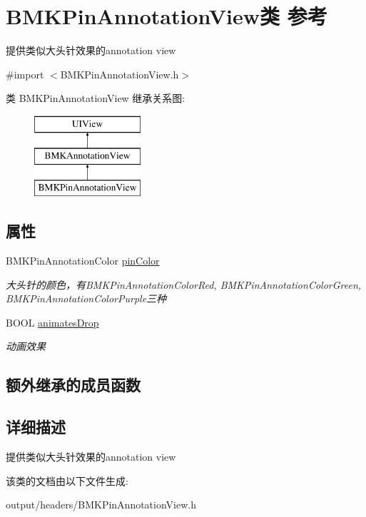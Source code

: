 \hypertarget{interface_b_m_k_pin_annotation_view}{}\section{B\+M\+K\+Pin\+Annotation\+View类 参考}
\label{interface_b_m_k_pin_annotation_view}


提供类似大头针效果的annotation view  




{\ttfamily \#import $<$B\+M\+K\+Pin\+Annotation\+View.\+h$>$}

类 B\+M\+K\+Pin\+Annotation\+View 继承关系图\+:\begin{figure}[H]
\begin{center}
\leavevmode
\includegraphics[height=3.000000cm]{interface_b_m_k_pin_annotation_view}
\end{center}
\end{figure}
\subsection*{属性}
\begin{DoxyCompactItemize}
\item 
\hypertarget{interface_b_m_k_pin_annotation_view_a84f4c8db4dfa8d1d5a8ff6af8db7826d}{}B\+M\+K\+Pin\+Annotation\+Color \hyperlink{interface_b_m_k_pin_annotation_view_a84f4c8db4dfa8d1d5a8ff6af8db7826d}{pin\+Color}\label{interface_b_m_k_pin_annotation_view_a84f4c8db4dfa8d1d5a8ff6af8db7826d}

\begin{DoxyCompactList}\small\item\em 大头针的颜色，有\+B\+M\+K\+Pin\+Annotation\+Color\+Red, B\+M\+K\+Pin\+Annotation\+Color\+Green, B\+M\+K\+Pin\+Annotation\+Color\+Purple三种 \end{DoxyCompactList}\item 
\hypertarget{interface_b_m_k_pin_annotation_view_a0ea18aa3b2d71e06564bf11199d05625}{}B\+O\+O\+L \hyperlink{interface_b_m_k_pin_annotation_view_a0ea18aa3b2d71e06564bf11199d05625}{animates\+Drop}\label{interface_b_m_k_pin_annotation_view_a0ea18aa3b2d71e06564bf11199d05625}

\begin{DoxyCompactList}\small\item\em 动画效果 \end{DoxyCompactList}\end{DoxyCompactItemize}
\subsection*{额外继承的成员函数}


\subsection{详细描述}
提供类似大头针效果的annotation view 

该类的文档由以下文件生成\+:\begin{DoxyCompactItemize}
\item 
output/headers/B\+M\+K\+Pin\+Annotation\+View.\+h\end{DoxyCompactItemize}
